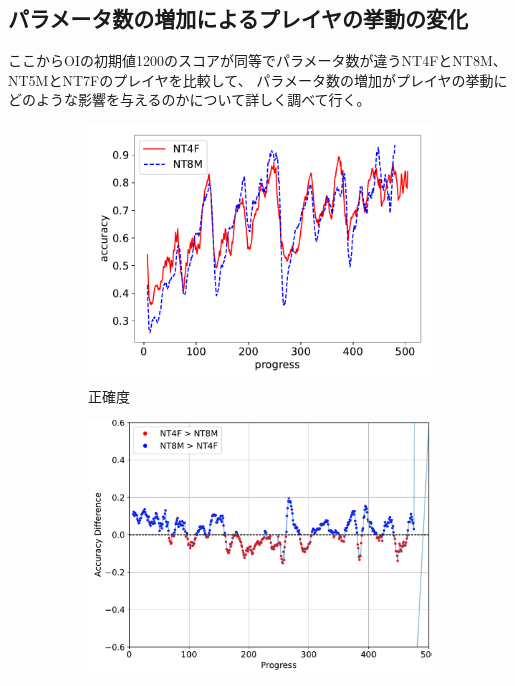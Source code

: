\subsection{パラメータ数の増加によるプレイヤの挙動の変化}
ここからOIの初期値1200のスコアが同等でパラメータ数が違うNT4FとNT8M、NT5MとNT7Fのプレイヤを比較して、
パラメータ数の増加がプレイヤの挙動にどのような影響を与えるのかについて詳しく調べて行く。
\begin{figure}[t]
\centering
\begin{subfigure}[b]{0.49\linewidth}
    \includegraphics[width=\linewidth]{pdf/compare/NT4F_and_NT8M/accuracy.pdf}
    \caption{正確度}
    \label{fig:NT4F_and_NT8M_accuracy}
\end{subfigure}
\begin{subfigure}[b]{0.49\linewidth}
    \includegraphics[width=\linewidth]{pdf/compare/NT4F_and_NT8M/acc_diff_plot.pdf}

\end{subfigure}
\end{figure}
